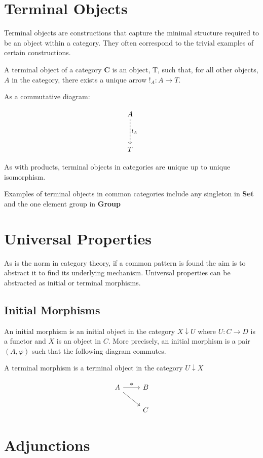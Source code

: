 \documentclass[a4paper,12pt]{article}
\begin{document}
\section{Terminal Objects}
Terminal objects are constructions that capture the
minimal structure required to be an object within a category. They often
correspond to the trivial examples of certain constructions.

A terminal object of a category \textbf{C} is an object, T, such that, for all
other objects, $A$ in the category, there exists a unique arrow $!_{A}: A
\rightarrow T$.

As a commutative diagram:

\[\begin{tikzcd}[sep=huge]
A \arrow[d, "!_A", dashed] \\
T
\end{tikzcd}\]

As with products, terminal objects in categories are unique up to unique
isomorphism.

Examples of terminal objects in common categories include any singleton in
\textbf{Set} and the one element group in \textbf{Group}


\section{Universal Properties}
As is the norm in category theory, if a common pattern is found the aim is to
abstract it to find its underlying mechanism. Universal properties can
be abstracted as initial or terminal morphisms.

\subsection{Initial Morphisms}
An initial morphism is an initial object in the category $X \downarrow U$ where
$U : C \rightarrow D$ is a functor and $X$ is an object in $C$. More precisely,
an initial morphism is a pair $(A, \varphi)$ such that the following diagram
commutes.

A terminal morphism is a terminal object in the category $U \downarrow X$

\[\begin{tikzcd}
    A \arrow[rd] \arrow[r, "\phi"] & B \\
                                   & C
\end{tikzcd}\]

\section{Adjunctions}
\end{document}
